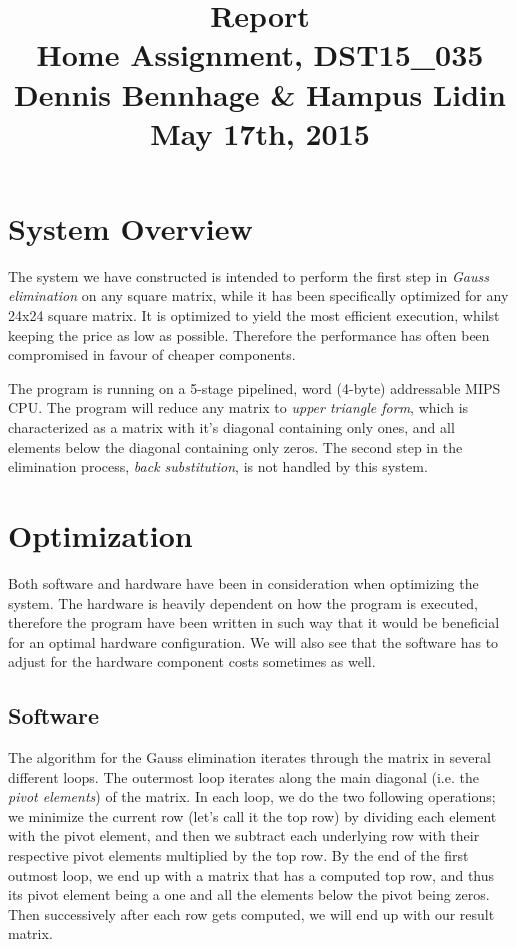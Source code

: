 \documentclass[a4paper,9pt,fleqn]{article}
\title{
{\bf Report}\\
\vspace{0.2cm}
%
Home Assignment, DST15\_035\\
\vspace{1cm}
%
{\large Dennis Bennhage \& Hampus Lidin}\\
\vspace{10cm}
%
May 17th, 2015
}
\date{}
\begin{document}
\maketitle

\newpage

\section{System Overview}
The system we have constructed is intended to perform the first step in {\it Gauss elimination}
on any square matrix, while it has been specifically optimized for any 24x24 square matrix.
It is optimized to yield the most efficient execution, whilst keeping the price as low as
possible. Therefore the performance has often been compromised in favour of cheaper components.

The program is running on a 5-stage pipelined, word (4-byte) addressable MIPS CPU. The program will
reduce any matrix to {\it upper triangle form}, which is characterized as a matrix with it's diagonal 
containing only ones, and all elements below the diagonal containing only zeros. The second step in the 
elimination process, {\it back substitution}, is not handled by this system.

\section{Optimization}
Both software and hardware have been in consideration when optimizing the system. The hardware
is heavily dependent on how the program is executed, therefore the program have been 
written in such way that it would be beneficial for an optimal hardware configuration. We will
also see that the software has to adjust for the hardware component costs sometimes as well.

\subsection{Software}
The algorithm for the Gauss elimination iterates through the matrix in several different loops.
The outermost loop iterates along the main diagonal (i.e. the {\it pivot elements}) of the matrix.
In each loop, we do the two following operations; we minimize the current row (let's call it the
top row) by dividing each element with the pivot element, and then we subtract each underlying row
with their respective pivot elements multiplied by the top row. By the end of the first outmost loop,
we end up with a matrix that has a computed top row, and thus its pivot element being a one and all
the elements below the pivot being zeros. Then successively after each row gets computed, we will end
up with our result matrix.
\end{document}
